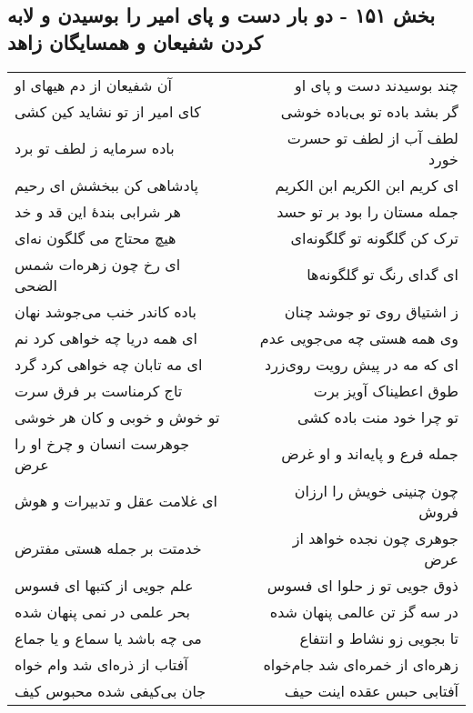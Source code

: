\begin{center}
\section*{بخش ۱۵۱ - دو بار دست و پای امیر را بوسیدن و لابه کردن شفیعان و همسایگان زاهد}
\label{sec:sh151}
\begin{longtable}{l p{0.5cm} r}
آن شفیعان از دم هیهای او
&&
چند بوسیدند دست و پای او
\\
کای امیر از تو نشاید کین کشی
&&
گر بشد باده تو بی‌باده خوشی
\\
باده سرمایه ز لطف تو برد
&&
لطف آب از لطف تو حسرت خورد
\\
پادشاهی کن ببخشش ای رحیم
&&
ای کریم ابن الکریم ابن الکریم
\\
هر شرابی بندهٔ این قد و خد
&&
جمله مستان را بود بر تو حسد
\\
هیچ محتاج می گلگون نه‌ای
&&
ترک کن گلگونه تو گلگونه‌ای
\\
ای رخ چون زهره‌ات شمس الضحی
&&
ای گدای رنگ تو گلگونه‌ها
\\
باده کاندر خنب می‌جوشد نهان
&&
ز اشتیاق روی تو جوشد چنان
\\
ای همه دریا چه خواهی کرد نم
&&
وی همه هستی چه می‌جویی عدم
\\
ای مه تابان چه خواهی کرد گرد
&&
ای که مه در پیش رویت روی‌زرد
\\
تاج کرمناست بر فرق سرت
&&
طوق اعطیناک آویز برت
\\
تو خوش و خوبی و کان هر خوشی
&&
تو چرا خود منت باده کشی
\\
جوهرست انسان و چرخ او را عرض
&&
جمله فرع و پایه‌اند و او غرض
\\
ای غلامت عقل و تدبیرات و هوش
&&
چون چنینی خویش را ارزان فروش
\\
خدمتت بر جمله هستی مفترض
&&
جوهری چون نجده خواهد از عرض
\\
علم جویی از کتبها ای فسوس
&&
ذوق جویی تو ز حلوا ای فسوس
\\
بحر علمی در نمی پنهان شده
&&
در سه گز تن عالمی پنهان شده
\\
می چه باشد یا سماع و یا جماع
&&
تا بجویی زو نشاط و انتفاع
\\
آفتاب از ذره‌ای شد وام خواه
&&
زهره‌ای از خمره‌ای شد جام‌خواه
\\
جان بی‌کیفی شده محبوس کیف
&&
آفتابی حبس عقده اینت حیف
\\
\end{longtable}
\end{center}
